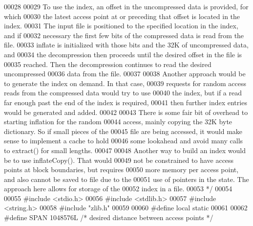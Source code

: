 \begin{DoxyCode}
00028 \textcolor{comment}{}
00029 \textcolor{comment}{   To use the index, an offset in the uncompressed data is provided, for which}
00030 \textcolor{comment}{   the latest access point at or preceding that offset is located in the index.}
00031 \textcolor{comment}{   The input file is positioned to the specified location in the index, and if}
00032 \textcolor{comment}{   necessary the first few bits of the compressed data is read from the file.}
00033 \textcolor{comment}{   inflate is initialized with those bits and the 32K of uncompressed data, and}
00034 \textcolor{comment}{   the decompression then proceeds until the desired offset in the file is}
00035 \textcolor{comment}{   reached.  Then the decompression continues to read the desired uncompressed}
00036 \textcolor{comment}{   data from the file.}
00037 \textcolor{comment}{}
00038 \textcolor{comment}{   Another approach would be to generate the index on demand.  In that case,}
00039 \textcolor{comment}{   requests for random access reads from the compressed data would try to use}
00040 \textcolor{comment}{   the index, but if a read far enough past the end of the index is required,}
00041 \textcolor{comment}{   then further index entries would be generated and added.}
00042 \textcolor{comment}{}
00043 \textcolor{comment}{   There is some fair bit of overhead to starting inflation for the random}
00044 \textcolor{comment}{   access, mainly copying the 32K byte dictionary.  So if small pieces of the}
00045 \textcolor{comment}{   file are being accessed, it would make sense to implement a cache to hold}
00046 \textcolor{comment}{   some lookahead and avoid many calls to extract() for small lengths.}
00047 \textcolor{comment}{}
00048 \textcolor{comment}{   Another way to build an index would be to use inflateCopy().  That would}
00049 \textcolor{comment}{   not be constrained to have access points at block boundaries, but requires}
00050 \textcolor{comment}{   more memory per access point, and also cannot be saved to file due to the}
00051 \textcolor{comment}{   use of pointers in the state.  The approach here allows for storage of the}
00052 \textcolor{comment}{   index in a file.}
00053 \textcolor{comment}{ */}
00054 
00055 \textcolor{preprocessor}{#include <stdio.h>}
00056 \textcolor{preprocessor}{#include <stdlib.h>}
00057 \textcolor{preprocessor}{#include <string.h>}
00058 \textcolor{preprocessor}{#include "zlib.h"}
00059 
00060 \textcolor{preprocessor}{#define local static}
00061 
00062 \textcolor{preprocessor}{#define SPAN 1048576L       }\textcolor{comment}{/* desired distance between access points */}\textcolor{preprocessor}{}

\end{DoxyCode}
